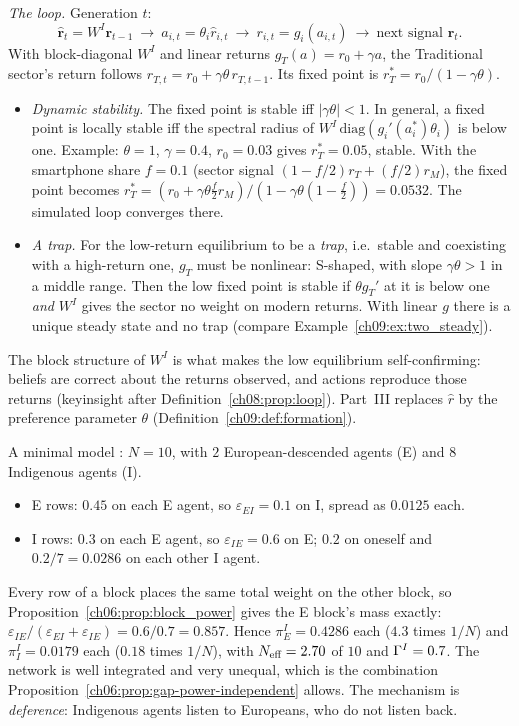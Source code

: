 \documentclass[../solutions_manual.tex]{subfiles}
\begin{document}
 \emph{The loop.} Generation $t$:
\[
\hat{\mathbf r}_t = W^I\mathbf r_{t-1}\ \longrightarrow\ a_{i,t} = \theta_i\hat r_{i,t}\ \longrightarrow\ r_{i,t} = g_i(a_{i,t})\ \longrightarrow\ \text{next signal } \mathbf r_t .
\]
With block-diagonal $W^I$ and linear returns $g_T(a) = r_0 + \gamma a$, the Traditional sector's return follows $r_{T,t} = r_0 + \gamma\theta\,r_{T,t-1}$. Its fixed point is $r_T^* = r_0/(1 - \gamma\theta)$.
\begin{itemize}
\item \emph{Dynamic stability.} The fixed point is stable iff $|\gamma\theta| < 1$. In general, a fixed point is locally stable iff the spectral radius of $W^I\,\mathrm{diag}(g_i'(a_i^*)\theta_i)$ is below one. Example: $\theta = 1$, $\gamma = 0.4$, $r_0 = 0.03$ gives $r_T^* = 0.05$, stable. With the smartphone share $f = 0.1$ (sector signal $(1 - f/2)r_T + (f/2)r_M$), the fixed point becomes $r_T^* = (r_0 + \gamma\theta\frac f2 r_M)/(1 - \gamma\theta(1 - \frac f2)) = 0.0532$. The simulated loop converges there.
\item \emph{A trap.} For the low-return equilibrium to be a \emph{trap}, i.e.\ stable and coexisting with a high-return one, $g_T$ must be nonlinear: S-shaped, with slope $\gamma\theta > 1$ in a middle range. Then the low fixed point is stable if $\theta g_T'$ at it is below one \emph{and} $W^I$ gives the sector no weight on modern returns. With linear $g$ there is a unique steady state and no trap (compare Example~\ref{ch09:ex:two_steady}).
\end{itemize}
The block structure of $W^I$ is what makes the low equilibrium self-confirming: beliefs are correct about the returns observed, and actions reproduce those returns (keyinsight after Definition~\ref{ch08:prop:loop}). Part~III replaces $\hat r$ by the preference parameter $\theta$ (Definition~\ref{ch09:def:formation}).


 A minimal model \illustrative: $N = 10$, with $2$ European-descended agents (E) and $8$ Indigenous agents (I).
\begin{itemize}
\item E rows: $0.45$ on each E agent, so $\varepsilon_{EI} = 0.1$ on I, spread as $0.0125$ each.
\item I rows: $0.3$ on each E agent, so $\varepsilon_{IE} = 0.6$ on E; $0.2$ on oneself and $0.2/7 = 0.0286$ on each other I agent.
\end{itemize}
Every row of a block places the same total weight on the other block, so Proposition~\ref{ch06:prop:block_power} gives the E block's mass exactly: $\varepsilon_{IE}/(\varepsilon_{EI} + \varepsilon_{IE}) = 0.6/0.7 = 0.857$. Hence $\pi^I_E = 0.4286$ each ($4.3$ times $1/N$) and $\pi^I_I = 0.0179$ each ($0.18$ times $1/N$), with $N_{\text{eff}} = 2.70$ of $10$ and $\Gamma^I = 0.7$. The network is well integrated and very unequal, which is the combination Proposition~\ref{ch06:prop:gap-power-independent} allows. The mechanism is \emph{deference}: Indigenous agents listen to Europeans, who do not listen back.
\end{document}
